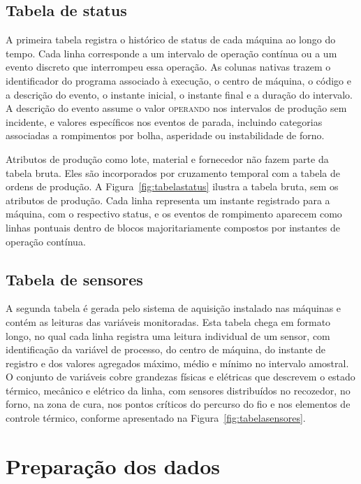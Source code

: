\subsection{Tabela de status}
\label{subsec:tabela_status}

A primeira tabela registra o histórico de status de cada máquina ao longo do tempo. Cada linha corresponde a um intervalo de operação contínua ou a um evento discreto que interrompeu essa operação. As colunas nativas trazem o identificador do programa associado à execução, o centro de máquina, o código e a descrição do evento, o instante inicial, o instante final e a duração do intervalo. A descrição do evento assume o valor \textsc{operando} nos intervalos de produção sem incidente, e valores específicos nos eventos de parada, incluindo categorias associadas a rompimentos por bolha, asperidade ou instabilidade de forno.

Atributos de produção como lote, material e fornecedor não fazem parte da tabela bruta. Eles são incorporados por cruzamento temporal com a tabela de ordens de produção. A Figura~\ref{fig:tabelastatus} ilustra a tabela bruta, sem os atributos de produção. Cada linha representa um instante registrado para a máquina, com o respectivo status, e os eventos de rompimento aparecem como linhas pontuais dentro de blocos majoritariamente compostos por instantes de operação contínua.


\subsection{Tabela de sensores}
\label{subsec:tabela_sensores}

A segunda tabela é gerada pelo sistema de aquisição instalado nas máquinas e contém as leituras das variáveis monitoradas. Esta tabela chega em formato longo, no qual cada linha registra uma leitura individual de um sensor, com identificação da variável de processo, do centro de máquina, do instante de registro e dos valores agregados máximo, médio e mínimo no intervalo amostral. O conjunto de variáveis cobre grandezas físicas e elétricas que descrevem o estado térmico, mecânico e elétrico da linha, com sensores distribuídos no recozedor, no forno, na zona de cura, nos pontos críticos do percurso do fio e nos elementos de controle térmico, conforme apresentado na Figura~\ref{fig:tabelasensores}.


\section{Preparação dos dados}
\label{sec:pipeline}

